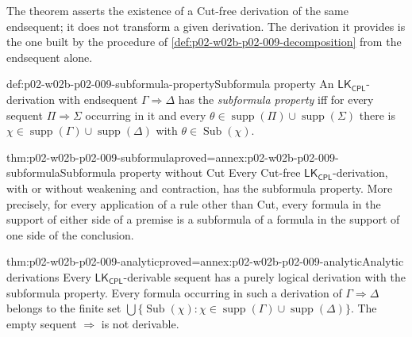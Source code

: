 The theorem asserts the existence of a Cut-free derivation of the same
endsequent; it does not transform a given derivation.  The derivation it
provides is the one built by the procedure of
\cref{def:p02-w02b-p02-009-decomposition} from the endsequent alone.

\begin{hbdefinition}{def:p02-w02b-p02-009-subformula-property}{Subformula property}
An \(\mathsf{LK}_{\mathsf{CPL}}\)-derivation with endsequent
\(\Gamma\Rightarrow\Delta\) has the \emph{subformula property} iff for every
sequent \(\Pi\Rightarrow\Sigma\) occurring in it and every
\(\theta\in\operatorname{supp}(\Pi)\cup\operatorname{supp}(\Sigma)\) there is
\(\chi\in\operatorname{supp}(\Gamma)\cup\operatorname{supp}(\Delta)\) with
\(\theta\in\operatorname{Sub}(\chi)\).
\end{hbdefinition}

\begin{hbtheorem}{thm:p02-w02b-p02-009-subformula}{proved=annex:p02-w02b-p02-009-subformula}{Subformula property without Cut}
Every Cut-free \(\mathsf{LK}_{\mathsf{CPL}}\)-derivation, with or without
weakening and contraction, has the subformula property.  More precisely,
for every application of a rule other than Cut, every formula in the
support of either side of a premise is a subformula of a formula in the
support of one side of the conclusion.
\end{hbtheorem}

\begin{hbcorollary}{thm:p02-w02b-p02-009-analytic}{proved=annex:p02-w02b-p02-009-analytic}{Analytic derivations}
Every \(\mathsf{LK}_{\mathsf{CPL}}\)-derivable sequent has a purely logical
derivation with the subformula property.  Every formula occurring in such a
derivation of \(\Gamma\Rightarrow\Delta\) belongs to the finite set
\(\bigcup\{\operatorname{Sub}(\chi):\chi\in\operatorname{supp}(\Gamma)\cup
\operatorname{supp}(\Delta)\}\).  The empty sequent \({}\Rightarrow{}\) is
not derivable.
\end{hbcorollary}

